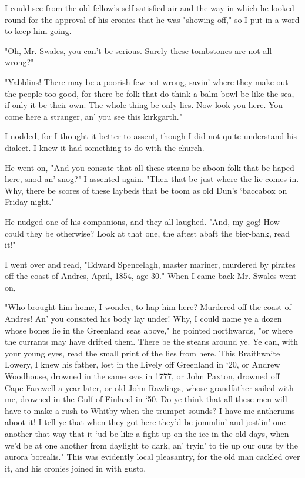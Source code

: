 I could see from the old fellow's self-satisfied air and the way in which he looked round for the approval of his cronies that he was "showing off," so I put in a word to keep him going. 

"Oh, Mr. Swales, you can't be serious. Surely these tombstones are not all wrong?" 

"Yabblins! There may be a poorish few not wrong, savin' where they make out the people too good, for there be folk that do think a balm-bowl be like the sea, if only it be their own. The whole thing be only lies. Now look you here. You come here a stranger, an' you see this kirkgarth." 

I nodded, for I thought it better to assent, though I did not quite understand his dialect. I knew it had something to do with the church. 

He went on, "And you consate that all these steans be aboon folk that be haped here, snod an' snog?" I assented again. "Then that be just where the lie comes in. Why, there be scores of these laybeds that be toom as old Dun's `baccabox on Friday night." 

He nudged one of his companions, and they all laughed. "And, my gog! How could they be otherwise? Look at that one, the aftest abaft the bier-bank, read it!" 

I went over and read, "Edward Spencelagh, master mariner, murdered by pirates off the coast of Andres, April, 1854, age 30." When I came back Mr. Swales went on, 

"Who brought him home, I wonder, to hap him here? Murdered off the coast of Andres! An' you consated his body lay under! Why, I could name ye a dozen whose bones lie in the Greenland seas above," he pointed northwards, "or where the currants may have drifted them. There be the steans around ye. Ye can, with your young eyes, read the small print of the lies from here. This Braithwaite Lowery, I knew his father, lost in the Lively off Greenland in `20, or Andrew Woodhouse, drowned in the same seas in 1777, or John Paxton, drowned off Cape Farewell a year later, or old John Rawlings, whose grandfather sailed with me, drowned in the Gulf of Finland in `50. Do ye think that all these men will have to make a rush to Whitby when the trumpet sounds? I have me antherums aboot it! I tell ye that when they got here they'd be jommlin' and jostlin' one another that way that it `ud be like a fight up on the ice in the old days, when we'd be at one another from daylight to dark, an' tryin' to tie up our cuts by the aurora borealis." This was evidently local pleasantry, for the old man cackled over it, and his cronies joined in with gusto. 

